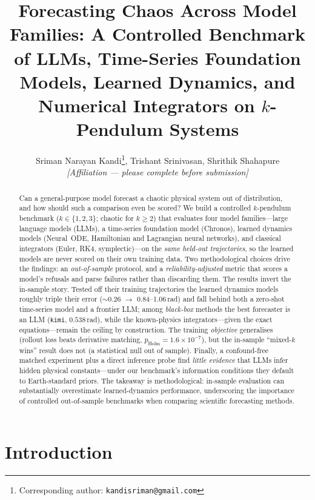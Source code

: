\documentclass{article}
\title{Forecasting Chaos Across Model Families: A Controlled Benchmark of
LLMs, Time-Series Foundation Models, Learned Dynamics, and Numerical
Integrators on $k$-Pendulum Systems}
\author{%
  Sriman Narayan Kandi\thanks{Corresponding author: \texttt{kandisriman@gmail.com}},
  Trishant Srinivasan,
  Shrithik Shahapure\\
  \textit{[Affiliation --- please complete before submission]}
}
\begin{document}
\maketitle

\begin{abstract}
Can a general-purpose model forecast a chaotic physical system out of distribution,
and how should such a comparison even be scored? We build a controlled $k$-pendulum
benchmark ($k\in\{1,2,3\}$; chaotic for $k\ge2$) that evaluates four model
families---large language models (LLMs), a time-series foundation model (Chronos),
learned dynamics models (Neural~ODE, Hamiltonian and Lagrangian neural networks), and
classical integrators (Euler, RK4, symplectic)---on the \emph{same held-out
trajectories}, so the learned models are never scored on their own training data. Two
methodological choices drive the findings: an \emph{out-of-sample} protocol, and a
\emph{reliability-adjusted} metric that scores a model's refusals and parse failures
rather than discarding them. The results invert the in-sample story. Tested off their
training trajectories the learned dynamics models roughly triple their error
($\sim$0.26 $\to$ 0.84--1.06\,rad) and fall behind both a zero-shot time-series model
and a frontier LLM; among \emph{black-box} methods the best forecaster is an LLM
(\texttt{kimi}, $0.538$\,rad), while the known-physics integrators---given the exact
equations---remain the ceiling by construction. The training \emph{objective}
generalises (rollout loss beats derivative matching,
$p_{\mathrm{Holm}}{=}1.6{\times}10^{-7}$), but the in-sample ``mixed-$k$ wins'' result
does not (a statistical null out of sample). Finally, a confound-free matched
experiment plus a direct inference probe find \emph{little evidence} that LLMs infer
hidden physical constants---under our benchmark's information conditions they default
to Earth-standard priors. The takeaway is methodological: in-sample evaluation can
substantially overestimate learned-dynamics performance, underscoring the importance of
controlled out-of-sample benchmarks when comparing scientific forecasting methods.
\end{abstract}

\section{Introduction}
\end{document}
